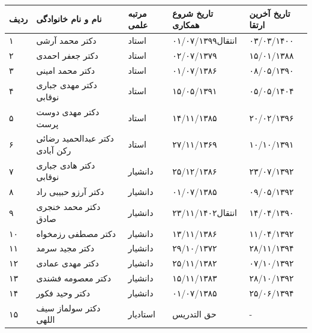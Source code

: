 \documentclass[
  letterpaper,
  DIV=11,
  numbers=noendperiod]{scrreprt}
\newcounter{none} %
\begin{document}
{\def\LTcaptype{none} %
\begin{longtable}[]{@{}
  >{\raggedright\arraybackslash}p{}
  >{\raggedright\arraybackslash}p{}
  >{\raggedright\arraybackslash}p{}
  >{\raggedright\arraybackslash}p{}
  >{\raggedright\arraybackslash}p{}@{}}
\toprule\noalign{}
\begin{minipage}[b]{\linewidth}\raggedright
ردیف
\end{minipage} & \begin{minipage}[b]{\linewidth}\raggedright
نام و نام خانوادگی
\end{minipage} & \begin{minipage}[b]{\linewidth}\raggedright
مرتبه علمی
\end{minipage} & \begin{minipage}[b]{\linewidth}\raggedright
تاریخ شروع همکاری
\end{minipage} & \begin{minipage}[b]{\linewidth}\raggedright
تاریخ آخرین ارتقا
\end{minipage} \\
\midrule\noalign{}
\endhead
\bottomrule\noalign{}
\endlastfoot
۱ & دکتر محمد آرشی & استاد & انتقال۰۱/۰۷/۱۳۹۹ & ۰۳/۰۳/۱۴۰۰ \\
۲ & دکتر جعفر احمدی & استاد & ۰۲/۰۷/۱۳۷۹ & ۱۵/۰۱/۱۳۸۸ \\
۳ & دکتر محمد امینی & استاد & ۰۱/۰۷/۱۳۸۶ & ۰۸/۰۵/۱۳۹۰ \\
۴ & دکتر مهدی جباری نوقابی & استاد & ۱۵/۰۵/۱۳۹۱ & ۰۵/۰۵/۱۴۰۴ \\
۵ & دکتر مهدی دوست پرست & استاد & ۱۴/۱۱/۱۳۸۵ & ۲۰/۰۲/۱۳۹۶ \\
۶ & دکتر عبدالحمید رضائی رکن آبادی & استاد & ۲۷/۱۱/۱۳۶۹ & ۱۰/۱۰/۱۳۹۱ \\
۷ & دکتر هادی جباری نوقابی & دانشیار & ۲۵/۱۲/۱۳۸۶ & ۲۳/۰۷/۱۳۹۲ \\
۸ & دکتر آرزو حبیبی راد & دانشیار & ۰۱/۰۷/۱۳۸۵ & ۰۹/۰۵/۱۳۹۲ \\
۹ & دکتر محمد خنجری صادق & دانشیار & انتقال۲۳/۱۱/۱۴۰۲ & ۱۴/۰۴/۱۳۹۰ \\
۱۰ & دکتر مصطفی رزمخواه & دانشیار & ۱۳/۱۱/۱۳۸۶ & ۱۱/۰۴/۱۳۹۲ \\
۱۱ & دکتر مجید سرمد & دانشیار & ۲۹/۱۰/۱۳۷۲ & ۲۸/۱۱/۱۳۹۴ \\
۱۲ & دکتر مهدی عمادی & دانشیار & ۲۵/۱۱/۱۳۸۲ & ۰۷/۱۰/۱۳۹۲ \\
۱۳ & دکتر معصومه فشندی & دانشیار & ۱۵/۱۱/۱۳۸۳ & ۲۸/۱۰/۱۳۹۲ \\
۱۴ & دکتر وحید فکور & دانشیار & ۰۱/۰۷/۱۳۸۵ & ۲۵/۰۶/۱۳۹۴ \\
۱۵ & دکتر سولماز سیف اللهی & استادیار & حق التدریس & - \\
\end{longtable}
}
\end{document}
